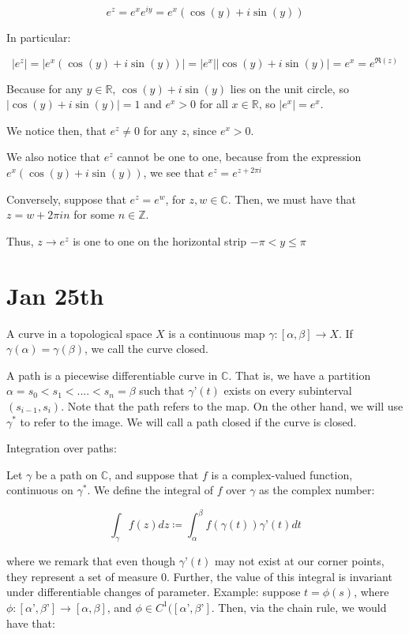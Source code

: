 \documentclass[10pt]{article}
\begin{document}
$$ e^z = e^x e^{iy} = e^x (\cos(y) + i \sin(y)) $$

In particular:

$$ |e^z| = | e^x (\cos(y) + i \sin(y)) | = |e^x| |\cos(y) + i \sin(y)| = e^x = e^{\Re(z)}$$

Because for any $y \in \mathbb{R}$,  $\cos(y) + i \sin(y)$ lies on the unit circle, so $|\cos(y) + i \sin(y)| = 1$ and $e^x > 0$ for all $x \in \mathbb{R}$, so $|e^x| = e^x$.

We notice then, that $e^z \not = 0$ for any $z$, since $e^x > 0$. 

We also notice that $e^z$ cannot be one to one, because from the expression $e^x (\cos(y) + i \sin(y)) $, we see that $e^{z} = e^{z + 2\pi i}$

Conversely, suppose that $e^z = e^w$, for $z,w \in \mathbb{C}$. Then, we must have that $z = w + 2\pi i n$ for some $n \in \mathbb{Z}$.

Thus, $z \to e^z$ is one to one on the horizontal strip $-\pi < y \leq \pi$

\section*{Jan 25th}

A curve in a topological space $X$ is a continuous map $\gamma: [\alpha,\beta] \to X$. If $\gamma(\alpha) = \gamma(\beta)$, we call the curve closed.

A path is a piecewise differentiable curve in $\mathbb{C}$. That is, we have a partition $\alpha = s_0 < s_1 <.... < s_n = \beta$ such that $\gamma’(t)$ exists on every subinterval $(s_{i-1}, s_i)$. Note that the path refers to the map. On the other hand, we will use $\gamma^*$ to refer to the image. We will call a path closed if the curve is closed.

Integration over paths:

Let $\gamma$ be a path on $\mathbb{C}$, and suppose that $f$ is a complex-valued function, continuous on $\gamma^*$. We define the integral of $f$ over $\gamma$ as the complex number:

$$ \int_\gamma f(z) dz \coloneqq \int_\alpha^\beta f(\gamma(t)) \gamma’(t) dt$$

where we remark that even though $\gamma’(t)$ may not exist at our corner points, they represent a set of measure 0. Further, the value of this integral is invariant under differentiable changes of parameter. Example: suppose $t = \phi(s)$, where $\phi: [\alpha’, \beta’] \to [\alpha, \beta]$, and $\phi \in C^1([\alpha’, \beta’]$. Then, via the chain rule, we would have that:
\end{document}
